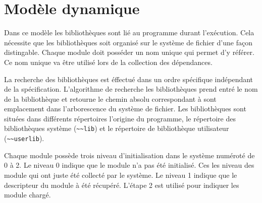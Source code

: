 \section{Modèle dynamique}
Dans ce modèle les bibliothèques sont lié au programme durant l'exécution. Cela
nécessite que les bibliothèques soit organisé sur le système de fichier d'une façon
distingable. Chaque module doit posséder un nom unique qui permet d'y référer.
Ce nom unique va être utilisé lors de la collection des dépendances.




La recherche des bibliothèques est éffectué dans un ordre spécifique
indépendant de la spécification.  L'algorithme de recherche les bibliothèques
prend entré le nom de la bibliothèque et retourne le chemin absolu
correspondant à sont emplacement dans l'arborescence du système de fichier. Les
bibliothèques sont situées dans différents répertoires l'origine du programme,
le répertoire des bibliothèques système (\lstinline{~~lib}) et le
répertoire de bibliothèque utilisateur (\lstinline{~~userlib}).


Chaque module possède trois niveau d'initialisation dans le système numéroté de
0 à 2. Le niveau 0 indique que le module n'a pas été initialisé. Ces les niveau
des module qui ont juste été collecté par le système. Le niveau 1 indique que
le descripteur du module à été récupéré. L'étape 2 est utilisé pour indiquer
les module chargé.

